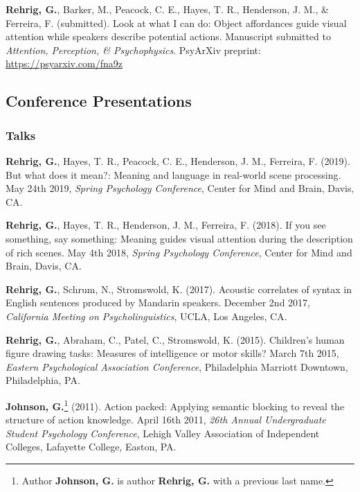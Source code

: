 \textbf{Rehrig, G.}, Barker, M., Peacock, C. E., Hayes, T. R., Henderson, J. M., \& Ferreira, F. (submitted). Look at what I can do: Object affordances guide visual attention while speakers describe potential actions. Manuscript submitted to \textit{Attention, Perception, \& Psychophysics}. PsyArXiv preprint: \url{https://psyarxiv.com/fna9z}



\subsection*{Conference Presentations}

\subsubsection*{Talks}

\textbf{Rehrig, G.}, Hayes, T. R., Peacock, C. E., Henderson, J. M., Ferreira, F. (2019). But what does it mean?: Meaning and language in real-world scene processing. May 24th 2019, \textit{Spring Psychology Conference}, Center for Mind and Brain, Davis, CA.


\textbf{Rehrig, G.}, Hayes, T. R., Henderson, J. M., Ferreira, F. (2018). If you see something, say something: Meaning guides visual attention during the description of rich scenes. May 4th 2018, \textit{Spring Psychology Conference}, Center for Mind and Brain, Davis, CA.


\textbf{Rehrig, G.}, Schrum, N., Stromswold, K. (2017). Acoustic correlates of syntax in English sentences produced by Mandarin speakers. December 2nd 2017, \textit{California Meeting on Psycholinguistics}, UCLA, Los Angeles, CA.



\textbf{Rehrig, G.}, Abraham, C., Patel, C., Stromswold, K. (2015). Children's human figure drawing tasks: Measures of intelligence or motor skills? March 7th 2015, \textit{Eastern Psychological Association Conference}, Philadelphia Marriott Downtown, Philadelphia, PA.



\textbf{Johnson, G.}\footnote{Author \textbf{Johnson, G.} is author \textbf{Rehrig, G.} with a previous last name.} (2011). Action packed: Applying semantic blocking to reveal the structure of action knowledge.  April 16th 2011, \textit{26th Annual Undergraduate Student Psychology Conference}, Lehigh Valley Association of Independent Colleges, Lafayette College, Easton, PA.

